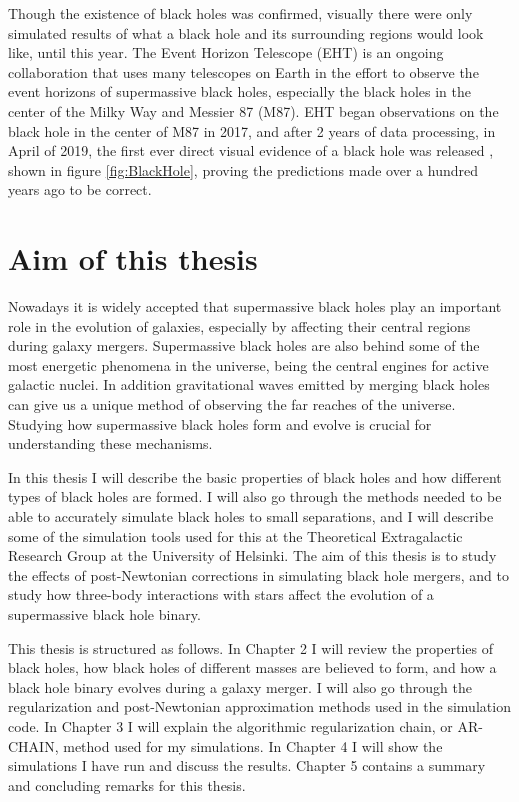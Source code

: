 \documentclass[english, oneside]{HYgradu}
\begin{document}
Though the existence of black holes was confirmed, visually there were only simulated results of what a black hole and its surrounding regions would look like, until this year. The Event Horizon Telescope (EHT) is an ongoing collaboration that uses many telescopes on Earth in the effort to observe the event horizons of supermassive black holes, especially the black holes in the center of the Milky Way and Messier 87 (M87). EHT began observations on the black hole in the center of M87 in 2017, and after 2 years of data processing, in April of 2019, the first ever direct visual evidence of a black hole was released \citep{akiyama:2019}, shown in figure \ref{fig:BlackHole}, proving the predictions made over a hundred years ago to be correct.

\section{Aim of this thesis}

Nowadays it is widely accepted that supermassive black holes play an important role in the evolution of galaxies, especially by affecting their central regions during galaxy mergers. Supermassive black holes are also behind some of the most energetic phenomena in the universe, being the central engines for active galactic nuclei. In addition gravitational waves emitted by merging black holes can give us a unique method of observing the far reaches of the universe. Studying how supermassive black holes form and evolve is crucial for understanding these mechanisms.

In this thesis I will describe the basic properties of black holes and how different types of black holes are formed. I will also go through the methods needed to be able to accurately simulate black holes to small separations, and I will describe some of the simulation tools used for this at the Theoretical Extragalactic Research Group at the University of Helsinki. The aim of this thesis is to study the effects of post-Newtonian corrections in simulating black hole mergers, and to study how three-body interactions with stars affect the evolution of a supermassive black hole binary. 

This thesis is structured as follows. In Chapter 2 I will review the properties of black holes, how black holes of different masses are believed to form, and how a black hole binary evolves during a galaxy merger. I will also go through the regularization and post-Newtonian approximation methods used in the simulation code. In Chapter 3 I will explain the algorithmic regularization chain, or AR-CHAIN, method used for my simulations. In Chapter 4 I will show the simulations I have run and discuss the results. Chapter 5 contains a summary and concluding remarks for this thesis.
\end{document}
